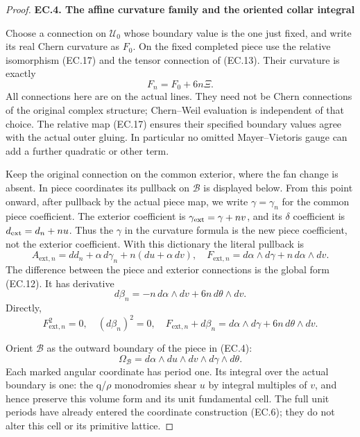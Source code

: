 \begin{proof}
\par

\medskip\noindent\textbf{EC.4. The affine curvature family and the oriented collar integral}

\par\nobreak

Choose a connection on \(\mathcal U_0\) whose boundary value is
the one just fixed, and write its real Chern curvature as \(F_0\).
On the fixed completed piece use the relative isomorphism
(EC.17) and the tensor connection of (EC.13). Their curvature is
exactly
\[
                         F_n=F_0+6n\Xi .
                                                        \tag{EC.22}
\]
All connections here are on the actual lines. They need not be
Chern connections of the original complex structure; Chern--Weil
evaluation is independent of that choice. The relative map
(EC.17) ensures their specified boundary values agree with
the actual outer gluing. In particular no omitted Mayer--Vietoris
gauge can add a further quadratic or other term.

Keep the original connection on the common exterior, where the
fan change is absent. In piece coordinates its pullback on
\(\mathcal B\) is displayed below. From this point onward, after
pullback by the actual piece map, we write \(\gamma=\gamma_n\)
for the common piece coefficient. The exterior coefficient is
\(\gamma_{\rm ext}=\gamma+nv\), and its \(\delta\) coefficient is
\(d_{\rm ext}=d_n+nu\). Thus the \(\gamma\) in the curvature
formula is the new piece coefficient, not the exterior coefficient.
With this dictionary the literal pullback is
\[
 A_{\mathrm{ext},n}
   =dd_n+\alpha\,d\gamma_n+n(du+\alpha\,dv),
\quad
 F_{\mathrm{ext},n}
   =d\alpha\wedge d\gamma+n\,d\alpha\wedge dv.
                                                        \tag{EC.23}
\]
The difference between the piece and exterior connections is
the global form (EC.12). It has derivative
\[
 d\beta_n=-n\,d\alpha\wedge dv+6n\,d\theta\wedge dv .
                                                        \tag{EC.24}
\]
Directly,
\[
 F_{\mathrm{ext},n}^2=0,\quad (d\beta_n)^2=0,
\quad F_{\mathrm{ext},n}+d\beta_n
            =d\alpha\wedge d\gamma+6n\,d\theta\wedge dv .
                                                        \tag{EC.25}
\]

Orient \(\mathcal B\) as the outward boundary of the piece in
(EC.4):
\[
 \Omega_{\mathcal B}
       =d\alpha\wedge du\wedge dv\wedge d\gamma\wedge d\theta .
                                                        \tag{EC.26}
\]
Each marked angular coordinate has period one. Its integral
over the actual boundary is one: the q/\(\rho\) monodromies shear
\(u\) by integral multiples of \(v\), and hence preserve this
volume form and its unit fundamental cell. The full unit
periods have already entered the coordinate construction
(EC.6); they do not alter this cell or its primitive lattice.


\end{proof}
